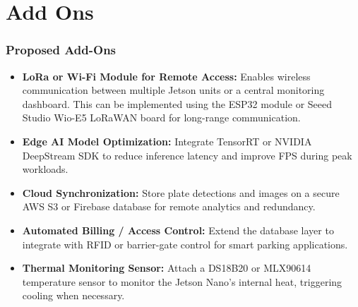 %
%

\chapter{Add Ons}

\subsection{Proposed Add-Ons}

\begin{itemize}
	\item \textbf{LoRa or Wi-Fi Module for Remote Access:}  
	Enables wireless communication between multiple Jetson units or a central monitoring dashboard.  
	This can be implemented using the ESP32 module or Seeed Studio Wio-E5 LoRaWAN board for long-range communication.
	
	\item \textbf{Edge AI Model Optimization:}  
	Integrate TensorRT or NVIDIA DeepStream SDK to reduce inference latency and improve FPS during peak workloads.
	
	\item \textbf{Cloud Synchronization:}  
	Store plate detections and images on a secure AWS S3 or Firebase database for remote analytics and redundancy.
	
	\item \textbf{Automated Billing / Access Control:}  
	Extend the database layer to integrate with RFID or barrier-gate control for smart parking applications.
	
	\item \textbf{Thermal Monitoring Sensor:}  
	Attach a DS18B20 or MLX90614 temperature sensor to monitor the Jetson Nano’s internal heat, triggering cooling when necessary.
\end{itemize}



